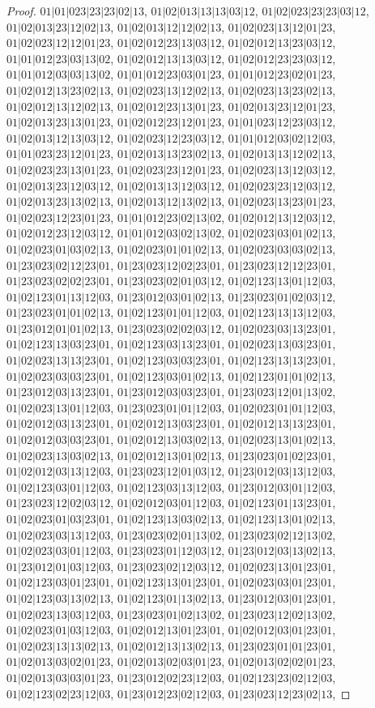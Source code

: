 \documentclass[12pt]{article}
\theoremstyle{plain}
\theoremstyle{definition}
\theoremstyle{remark}
\begin{document}
\begin{proof}
$01|01|023|23|23|02|13$, $01|02|013|13|13|03|12$, $01|02|023|23|23|03|12$, $01|02|013|23|12|02|13$, $01|02|013|12|12|02|13$, $01|02|023|13|12|01|23$, $01|02|023|12|12|01|23$, $01|02|012|23|13|03|12$, $01|02|012|13|23|03|12$, $01|01|012|23|03|13|02$, $01|02|012|13|13|03|12$, $01|02|012|23|23|03|12$, $01|01|012|03|03|13|02$, $01|01|012|23|03|01|23$, $01|01|012|23|02|01|23$, $01|02|012|13|23|02|13$, $01|02|023|13|12|02|13$, $01|02|023|13|23|02|13$, $01|02|012|13|12|02|13$, $01|02|012|23|13|01|23$, $01|02|013|23|12|01|23$, $01|02|013|23|13|01|23$, $01|02|012|23|12|01|23$, $01|01|023|12|23|03|12$, $01|02|013|12|13|03|12$, $01|02|023|12|23|03|12$, $01|01|012|03|02|12|03$, $01|01|023|23|12|01|23$, $01|02|013|13|23|02|13$, $01|02|013|13|12|02|13$, $01|02|023|23|13|01|23$, $01|02|023|23|12|01|23$, $01|02|023|13|12|03|12$, $01|02|013|23|12|03|12$, $01|02|013|13|12|03|12$, $01|02|023|23|12|03|12$, $01|02|013|23|13|02|13$, $01|02|013|12|13|02|13$, $01|02|023|13|23|01|23$, $01|02|023|12|23|01|23$, $01|01|012|23|02|13|02$, $01|02|012|13|12|03|12$, $01|02|012|23|12|03|12$, $01|01|012|03|02|13|02$, $01|02|023|03|01|02|13$, $01|02|023|01|03|02|13$, $01|02|023|01|01|02|13$, $01|02|023|03|03|02|13$, $01|23|023|02|12|23|01$, $01|23|023|12|02|23|01$, $01|23|023|12|12|23|01$, $01|23|023|02|02|23|01$, $01|23|023|02|01|03|12$, $01|02|123|13|01|12|03$, $01|02|123|01|13|12|03$, $01|23|012|03|01|02|13$, $01|23|023|01|02|03|12$, $01|23|023|01|01|02|13$, $01|02|123|01|01|12|03$, $01|02|123|13|13|12|03$, $01|23|012|01|01|02|13$, $01|23|023|02|02|03|12$, $01|02|023|03|13|23|01$, $01|02|123|13|03|23|01$, $01|02|123|03|13|23|01$, $01|02|023|13|03|23|01$, $01|02|023|13|13|23|01$, $01|02|123|03|03|23|01$, $01|02|123|13|13|23|01$, $01|02|023|03|03|23|01$, $01|02|123|03|01|02|13$, $01|02|123|01|01|02|13$, $01|23|012|03|13|23|01$, $01|23|012|03|03|23|01$, $01|23|023|12|01|13|02$, $01|02|023|13|01|12|03$, $01|23|023|01|01|12|03$, $01|02|023|01|01|12|03$, $01|02|012|03|13|23|01$, $01|02|012|13|03|23|01$, $01|02|012|13|13|23|01$, $01|02|012|03|03|23|01$, $01|02|012|13|03|02|13$, $01|02|023|13|01|02|13$, $01|02|023|13|03|02|13$, $01|02|012|13|01|02|13$, $01|23|023|01|02|23|01$, $01|02|012|03|13|12|03$, $01|23|023|12|01|03|12$, $01|23|012|03|13|12|03$, $01|02|123|03|01|12|03$, $01|02|123|03|13|12|03$, $01|23|012|03|01|12|03$, $01|23|023|12|02|03|12$, $01|02|012|03|01|12|03$, $01|02|123|01|13|23|01$, $01|02|023|01|03|23|01$, $01|02|123|13|03|02|13$, $01|02|123|13|01|02|13$, $01|02|023|03|13|12|03$, $01|23|023|02|01|13|02$, $01|23|023|02|12|13|02$, $01|02|023|03|01|12|03$, $01|23|023|01|12|03|12$, $01|23|012|03|13|02|13$, $01|23|012|01|03|12|03$, $01|23|023|02|12|03|12$, $01|02|023|13|01|23|01$, $01|02|123|03|01|23|01$, $01|02|123|13|01|23|01$, $01|02|023|03|01|23|01$, $01|02|123|03|13|02|13$, $01|02|123|01|13|02|13$, $01|23|012|03|01|23|01$, $01|02|023|13|03|12|03$, $01|23|023|01|02|13|02$, $01|23|023|12|02|13|02$, $01|02|023|01|03|12|03$, $01|02|012|13|01|23|01$, $01|02|012|03|01|23|01$, $01|02|023|13|13|02|13$, $01|02|012|13|13|02|13$, $01|23|023|01|01|23|01$, $01|02|013|03|02|01|23$, $01|02|013|02|03|01|23$, $01|02|013|02|02|01|23$, $01|02|013|03|03|01|23$, $01|23|012|02|23|12|03$, $01|02|123|23|02|12|03$, $01|02|123|02|23|12|03$, $01|23|012|23|02|12|03$, $01|23|023|12|23|02|13$, 
\end{proof}
\end{document}
